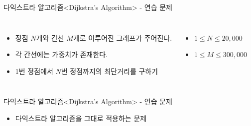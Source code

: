 
\begin{frame}{다익스트라 알고리즘}{<Dijkstra's Algorithm> - 연습 문제}
  \begin{center}
  \end{center}
  \vspace{4mm}
  \begin{columns}[T]
      \begin{itemize}
        \item 정점 $N$개와 간선 $M$개로 이루어진 그래프가 주어진다.
        \item 각 간선에는 가중치가 존재한다.
        \item 1번 정점에서 $N$번 정점까지의 최단거리를 구하기
      \end{itemize}
      \begin{itemize}
        \item $1 \le N \le 20{,}000$
        \item $1 \le M \le 300{,}000$
      \end{itemize}
  \end{columns}
\end{frame}

\begin{frame}{다익스트라 알고리즘}{<Dijkstra's Algorithm> - 연습 문제}
  \begin{center}
  \end{center}
  \vspace{8mm}
  \begin{itemize}
    \item 다익스트라 알고리즘을 그대로 적용하는 문제
  \end{itemize}
\end{frame}

